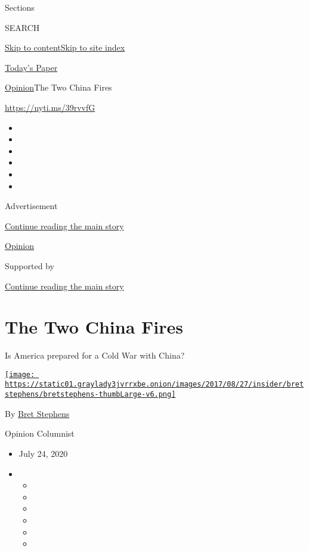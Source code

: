 Sections

SEARCH

\protect\hyperlink{site-content}{Skip to
content}\protect\hyperlink{site-index}{Skip to site index}

\href{https://myaccount.nytimes3xbfgragh.onion/auth/login?response_type=cookie\&client_id=vi}{}

\href{https://www.nytimes3xbfgragh.onion/section/todayspaper}{Today's
Paper}

\href{/section/opinion}{Opinion}\textbar{}The Two China Fires

\url{https://nyti.ms/39rvvfG}

\begin{itemize}
\item
\item
\item
\item
\item
\item
\end{itemize}

Advertisement

\protect\hyperlink{after-top}{Continue reading the main story}

\href{/section/opinion}{Opinion}

Supported by

\protect\hyperlink{after-sponsor}{Continue reading the main story}

\hypertarget{the-two-china-fires}{%
\section{The Two China Fires}\label{the-two-china-fires}}

Is America prepared for a Cold War with China?

\href{https://www.nytimes3xbfgragh.onion/by/bret-stephens}{\texttt{[image: https://static01.graylady3jvrrxbe.onion/images/2017/08/27/insider/bretstephens/bretstephens-thumbLarge-v6.png]}}

By \href{https://www.nytimes3xbfgragh.onion/by/bret-stephens}{Bret
Stephens}

Opinion Columnist

\begin{itemize}
\item
  July 24, 2020
\item
  \begin{itemize}
  \item
  \item
  \item
  \item
  \item
  \item
  \end{itemize}
\end{itemize}

